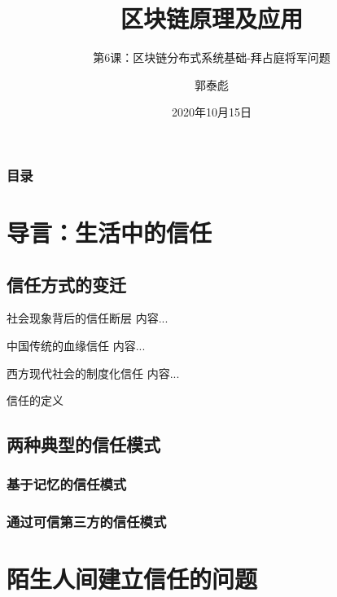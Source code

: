 \documentclass[11pt]{beamer}
\author{郭泰彪}
\title{区块链原理及应用}
\subtitle{第6课：区块链分布式系统基础-拜占庭将军问题}
\institute[湖工商大数据研究院]{湖南工商大学大数据与互联网创新研究院}
\date{2020年10月15日}
\begin{document}
\begin{frame}	
	\maketitle
\end{frame}

\begin{frame}
	\frametitle{目录}
	\tableofcontents[sectionstyle=show,subsectionstyle=show/shaded]
\end{frame}

\section{导言：生活中的信任}
\subsection{信任方式的变迁}

\begin{frame}{社会现象背后的信任断层}
	内容...
\end{frame}

\begin{frame}{中国传统的血缘信任}
	内容...
\end{frame}

\begin{frame}{西方现代社会的制度化信任}
	内容...
\end{frame}

\begin{frame}{信任的定义}

\end{frame}

\subsection{两种典型的信任模式}

\subsubsection{基于记忆的信任模式}

\subsubsection{通过可信第三方的信任模式}

\section{陌生人间建立信任的问题}
\end{document}
